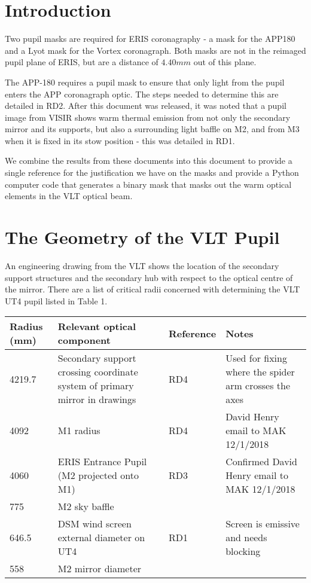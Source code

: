 \documentclass[a4paper,11pt]{article}
\begin{document}
\clearpage

\section{Introduction}
Two pupil masks are required for ERIS coronagraphy - a mask for the APP180 and
a Lyot mask for the Vortex coronagraph. Both masks are not in the reimaged
pupil plane of ERIS, but are a distance of $4.40mm$ out of this plane.

The APP-180 requires a pupil mask to ensure that only light from the pupil
enters the APP coronagraph optic. The steps needed to determine this are
detailed in RD2. After this document was released, it was noted that a pupil
image from VISIR shows warm thermal emission from not only the secondary mirror
and its supports, but also a surrounding light baffle on M2, and from M3 when
it is fixed in its stow position - this was detailed in RD1.

We combine the results from these documents into this document to provide a
single reference for the justification we have on the masks and provide a
Python computer code that generates a binary mask that masks out the warm
optical elements in the VLT optical beam.


\section{The Geometry of the VLT Pupil}

An engineering drawing from the VLT shows the location of the secondary support structures and the secondary hub with respect to the optical centre of the mirror. There are a list of critical radii concerned with determining the VLT UT4 pupil listed in Table 1.




\begin{tabular}{@{}llll@{}}
\toprule
Radius (mm)& Relevant optical component & Reference & Notes \\
\midrule
4219.7 & Secondary support crossing coordinate system of primary mirror in drawings & RD4 & Used for fixing where the spider arm crosses the axes \\
4092 & M1 radius & RD4 & David Henry email to MAK 12/1/2018 \\
4060 & ERIS Entrance Pupil (M2 projected onto M1) & RD3 & Confirmed David Henry email to MAK 12/1/2018 \\
775 & M2 sky baffle & & \\
646.5 & DSM wind screen external diameter on UT4 & RD1 & Screen is emissive and needs blocking \\
558 & M2 mirror diameter & & \\
\bottomrule
\end{tabular}
\end{document}
